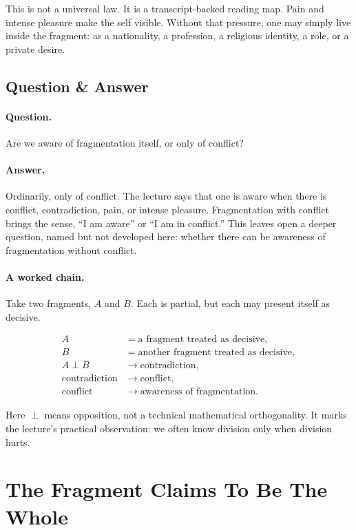 This is not a universal law. It is a transcript-backed reading map. Pain and intense pleasure make the self visible. Without that pressure, one may simply live inside the fragment: as a nationality, a profession, a religious identity, a role, or a private desire.

\subsection{Question \& Answer}

\paragraph{Question.}
Are we aware of fragmentation itself, or only of conflict?

\paragraph{Answer.}
Ordinarily, only of conflict. The lecture says that one is aware when there is conflict, contradiction, pain, or intense pleasure. Fragmentation with conflict brings the sense, ``I am aware'' or ``I am in conflict.'' This leaves open a deeper question, named but not developed here: whether there can be awareness of fragmentation without conflict.

\paragraph{A worked chain.}
Take two fragments, \(A\) and \(B\). Each is partial, but each may present itself as decisive.

\begin{align}
A &= \text{a fragment treated as decisive},\\
B &= \text{another fragment treated as decisive},\\
A \perp B &\longrightarrow \text{contradiction},\\
\text{contradiction} &\longrightarrow \text{conflict},\\
\text{conflict} &\longrightarrow \text{awareness of fragmentation}.
\end{align}

Here \(\perp\) means opposition, not a technical mathematical orthogonality. It marks the lecture's practical observation: we often know division only when division hurts.

\section{The Fragment Claims To Be The Whole}

